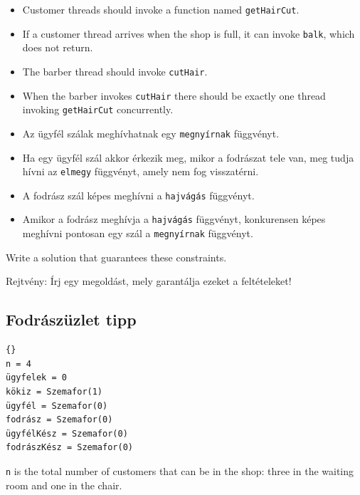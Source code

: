 \documentclass{book}
\newcommand{\clearemptydoublepage}{\newpage\cleardoublepage}
\begin{document}
\begin{itemize}

\item Customer threads should invoke a function named {\tt getHairCut}.

\item If a customer thread arrives when the shop is full, 
it can invoke {\tt balk}, which does not return.

\item The barber thread should invoke {\tt cutHair}.

\item When the barber invokes {\tt cutHair} there should
be exactly one thread invoking {\tt getHairCut} concurrently.

\end{itemize}

\begin{itemize}

\item Az ügyfél szálak meghívhatnak egy {\tt megnyírnak} függvényt.
\item Ha egy ügyfél szál akkor érkezik meg, mikor a fodrászat tele van,
meg tudja hívni az {\tt elmegy} függvényt, amely nem fog visszatérni.
\item A fodrász szál képes meghívni a {\tt hajvágás} függvényt.
\item Amikor a fodrász meghívja a {\tt hajvágás} függvényt, konkurensen képes
meghívni pontosan egy szál a {\tt megnyírnak} függvényt.
\end{itemize}

Write a solution that guarantees these constraints.

Rejtvény:
Írj egy megoldást, mely garantálja ezeket a feltételeket!


\clearemptydoublepage
\subsection{Fodrászüzlet tipp}



\begin{lstlisting}[title={Fodrászüzlet tipp}]{}
n = 4
ügyfelek = 0
kökiz = Szemafor(1)
ügyfél = Szemafor(0)
fodrász = Szemafor(0)
ügyfélKész = Szemafor(0)
fodrászKész = Szemafor(0)
\end{lstlisting}

{\tt n} is the total number of customers that can be in the shop:
three in the waiting room and one in the chair.
\end{document}
